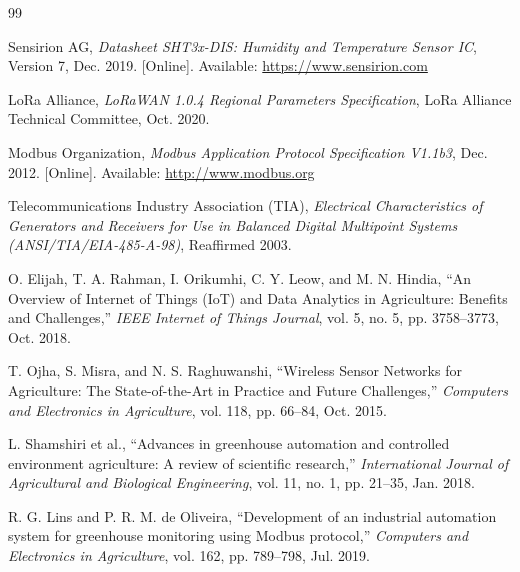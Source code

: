 \documentclass[12pt]{article}
\begin{document}
\begin{thebibliography}{99}

Sensirion AG, 
\textit{Datasheet SHT3x-DIS: Humidity and Temperature Sensor IC}, 
Version 7, Dec. 2019. [Online]. Available: \url{https://www.sensirion.com}

LoRa Alliance, 
\textit{LoRaWAN 1.0.4 Regional Parameters Specification}, 
LoRa Alliance Technical Committee, Oct. 2020.

Modbus Organization, 
\textit{Modbus Application Protocol Specification V1.1b3}, 
Dec. 2012. [Online]. Available: \url{http://www.modbus.org}

Telecommunications Industry Association (TIA), 
\textit{Electrical Characteristics of Generators and Receivers for Use in Balanced Digital Multipoint Systems (ANSI/TIA/EIA-485-A-98)}, 
Reaffirmed 2003.

O. Elijah, T. A. Rahman, I. Orikumhi, C. Y. Leow, and M. N. Hindia, 
``An Overview of Internet of Things (IoT) and Data Analytics in Agriculture: Benefits and Challenges,'' 
\textit{IEEE Internet of Things Journal}, vol. 5, no. 5, pp. 3758--3773, Oct. 2018.

T. Ojha, S. Misra, and N. S. Raghuwanshi, 
``Wireless Sensor Networks for Agriculture: The State-of-the-Art in Practice and Future Challenges,'' 
\textit{Computers and Electronics in Agriculture}, vol. 118, pp. 66--84, Oct. 2015.

L. Shamshiri et al., 
``Advances in greenhouse automation and controlled environment agriculture: A review of scientific research,'' 
\textit{International Journal of Agricultural and Biological Engineering}, vol. 11, no. 1, pp. 21--35, Jan. 2018.

R. G. Lins and P. R. M. de Oliveira, 
``Development of an industrial automation system for greenhouse monitoring using Modbus protocol,'' 
\textit{Computers and Electronics in Agriculture}, vol. 162, pp. 789--798, Jul. 2019.

\end{thebibliography}
\end{document}
